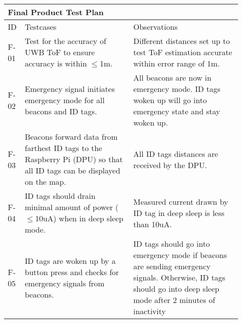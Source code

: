 \begin{table}[h!]
    \centering
    
    \begin{tabular}{|m{0.05\linewidth}|m{0.45\linewidth}|m{0.45\linewidth}|} 
    \hline
    \multicolumn{3}{|l|}{\textbf{Final Product Test Plan}}      \\ 
    \hline
    ID   & Testcases    & Observations     \\ 
    \hline
    
    F-01
    & Test for the accuracy of UWB ToF to ensure accuracy is within $\leq$1m.
    & Different distances set up to test ToF estimation accurate within error range of 1m.  \\ 
    \hline
    
    F-02 
    & Emergency signal initiates emergency mode for all beacons and ID tags.
    & All beacons are now in emergency mode. ID tags woken up will go into emergency state and stay woken up.  \\ 
    \hline
    
    F-03 
    & Beacons forward data from farthest ID tags to the Raspberry Pi (DPU) so that all ID tags 
    can be displayed on the map. & All ID tags distances are received by the DPU.  \\ 
    \hline

    F-04
    & ID tags should drain minimal amount of power ($\leq$10uA) when in deep sleep mode.
    & Measured current drawn by ID tag in deep sleep is less than 10uA.  \\ 
    \hline

    F-05
    & ID tags are woken up by a button press and checks for emergency signals from beacons.
    & ID tags should go into emergency mode if beacons are sending emergency signals. Otherwise, 
    ID tags should go into deep sleep mode after 2 minutes of inactivity  \\ 
    \hline


\end{tabular}
\end{table}
